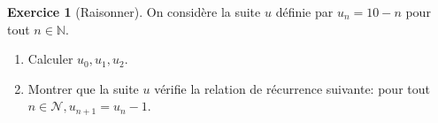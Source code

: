\documentclass{exam}
\theoremstyle{definition}
\newtheorem{exercice}{Exercice}
\begin{document}
\begin{exercice}[Raisonner]
    On considère la suite $u$ définie par $u_n = 10 - n$ pour tout $n \in \mathbb{N}$.
    \begin{enumerate}
        \item Calculer $u_0, u_1, u_2$.
        \item Montrer que la suite $u$ vérifie la relation de récurrence suivante: pour tout $n \in \mathcal{N}, u_{n+1} = u_n - 1$.
    \end{enumerate}
    \begin{center}
    \end{center}
\end{exercice}
\end{document}
